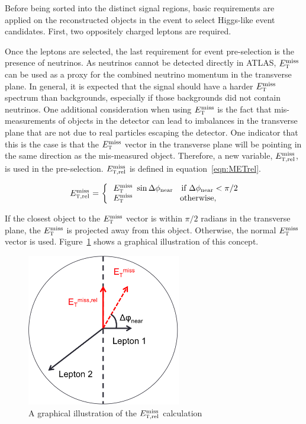 Before being sorted into the distinct signal regions, basic requirements are applied on the reconstructed objects in the event to select Higgs-like event candidates. First, two oppositely charged leptons are required. 

Once the leptons are selected, the last requirement for event pre-selection is the presence of neutrinos. As neutrinos cannot be detected directly in ATLAS, $E_{\textrm{\footnotesize\sc t}}^{\rm miss}$ can be used as a proxy for the combined neutrino momentum in the transverse plane. In general, it is expected that the signal should have a harder $E_{\textrm{\footnotesize\sc t}}^{\rm miss}$ spectrum than backgrounds, especially if those backgrounds did not contain neutrinos. One additional consideration when using $E_{\textrm{\footnotesize\sc t}}^{\rm miss}$ is the fact that mis-measurements of objects in the detector can lead to imbalances in the transverse plane that are not due to real particles escaping the detector. One indicator that this is the case is that the $E_{\textrm{\footnotesize\sc t}}^{\rm miss}$ vector in the transverse plane will be pointing in the same direction as the mis-measured object. Therefore, a new variable, $E_{{\textrm{\footnotesize\sc t}},{\rm rel}}^{\rm miss}$, is used in the pre-selection. $E_{{\textrm{\footnotesize\sc t}},{\rm rel}}^{\rm miss}$ is defined in equation~\ref{eqn:METrel}. 

\begin{equation}
  \begin{array}{ll}
  \multirow{2}{*}{$\METrel$ =\ \bigg\{ }
    &\!\!\!\!\MET\ \sin\dphiNear\quad\textrm{if $\dphiNear<\pi/2$}\\
    &\!\!\!\!\MET\ \phantom{\sin\dphiNear}\quad\textrm{otherwise,}
  \end{array}
\label{eqn:METrel}
\end{equation}

If the closest object to the $E_{\textrm{\footnotesize\sc t}}^{\rm miss}$ vector is within $\pi/2$ radians in the transverse plane, the $E_{\textrm{\footnotesize\sc t}}^{\rm miss}$ is projected away from this object. Otherwise, the normal $E_{\textrm{\footnotesize\sc t}}^{\rm miss}$ vector is used. Figure~\ref{fig:METrel} shows a graphical illustration of this concept. 

\begin{figure}[h!]
  \centering
  \captionsetup{justification=centering}

  \includegraphics[width=0.6\textwidth]{figures/METrel_cartoon}
  \caption{A graphical illustration of the $E_{{\textrm{\footnotesize\sc t}},{\rm rel}}^{\rm miss}$ calculation}
  \label{fig:METrel}
\end{figure}


